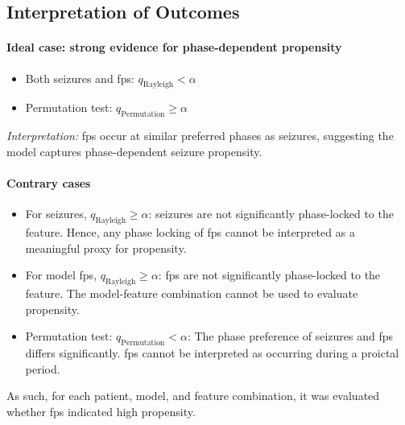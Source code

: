 \subsection{Interpretation of Outcomes} \label{subsec:interpretation-of-outcomes}

\paragraph{Ideal case: strong evidence for phase-dependent propensity}
\begin{itemize}
    \item Both seizures and \glspl{fp}: $q_{\mathrm{Rayleigh}} < \alpha$
    \item Permutation test: $q_{\mathrm{Permutation}} \geq \alpha$
\end{itemize}
\textit{Interpretation:} \Glspl{fp} occur at similar preferred phases as seizures, suggesting the model captures phase-dependent seizure propensity.

\paragraph{Contrary cases}
\begin{itemize}
    \item For seizures, $q_{\mathrm{Rayleigh}} \geq \alpha$: seizures are not significantly phase-locked to the feature.
    Hence, any phase locking of \glspl{fp} cannot be interpreted as a meaningful proxy for propensity.
    \item For model \glspl{fp}, $q_{\mathrm{Rayleigh}} \geq \alpha$: \glspl{fp} are not significantly phase-locked to the feature.
    The model-feature combination cannot be used to evaluate propensity.
    \item Permutation test: $q_{\mathrm{Permutation}} < \alpha$: The phase preference of seizures and \glspl{fp} differs significantly.
    \Glspl{fp} cannot be interpreted as occurring during a proictal period.
\end{itemize}

As such, for each patient, model, and feature combination, it was evaluated whether \glspl{fp} indicated high propensity.